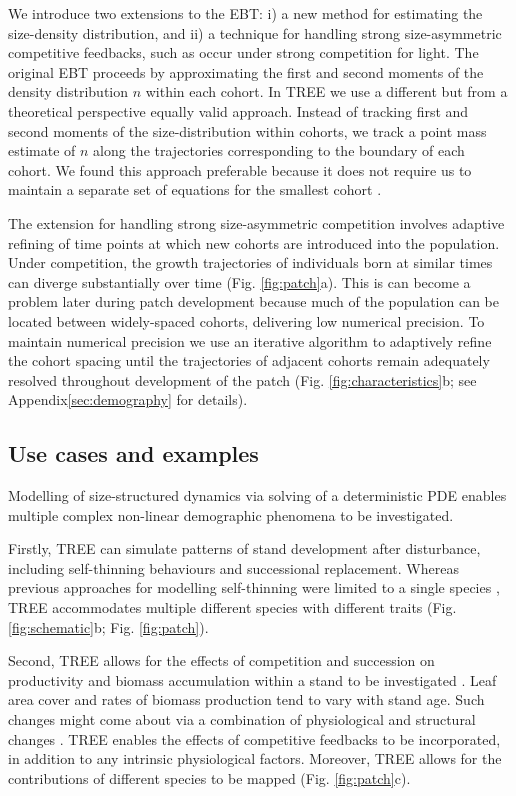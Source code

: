 \documentclass[]{article}
\begin{document}
We introduce two extensions to the EBT: i) a new method for estimating
the size-density distribution, and ii) a technique for handling strong
size-asymmetric competitive feedbacks, such as occur under strong
competition for light. The original EBT
\citep{Deroos-1997, Deroos-1992, Deroos-1988} proceeds by approximating
the first and second moments of the density distribution \(n\) within
each cohort. In TREE we use a different but from a theoretical
perspective equally valid approach. Instead of tracking first and second
moments of the size-distribution within cohorts, we track a point mass
estimate of \(n\) along the trajectories corresponding to the boundary
of each cohort. We found this approach preferable because it does not
require us to maintain a separate set of equations for the smallest
cohort \citep{Deroos-1997}.

The extension for handling strong size-asymmetric competition involves
adaptive refining of time points at which new cohorts are introduced
into the population. Under competition, the growth trajectories of
individuals born at similar times can diverge substantially over time
(Fig. \ref{fig:patch}a). This is can become a problem later during patch
development because much of the population can be located between
widely-spaced cohorts, delivering low numerical precision. To maintain
numerical precision we use an iterative algorithm to adaptively refine
the cohort spacing until the trajectories of adjacent cohorts remain
adequately resolved throughout development of the patch (Fig.
\ref{fig:characteristics}b; see Appendix\ref{sec:demography} for details).

\subsection{Use cases and examples}\label{use-cases-and-examples-1}

Modelling of size-structured dynamics via solving of a deterministic PDE
enables multiple complex non-linear demographic phenomena to be
investigated.

Firstly, TREE can simulate patterns of stand development after
disturbance, including self-thinning behaviours and successional
replacement. Whereas previous approaches for modelling self-thinning
were limited to a single species
\citep[e.g.][]{Barnes-2004, Coomes-2007}, TREE accommodates multiple
different species with different traits (Fig. \ref{fig:schematic}b; Fig.
\ref{fig:patch}).

Second, TREE allows for the effects of competition and succession on
productivity and biomass accumulation within a stand to be investigated
\citep{Falster-2011}. Leaf area cover and rates of biomass production
tend to vary with stand age. Such changes might come about via a
combination of physiological and structural changes
\citep{Binkley-2002, Smith-2001, Ogawa-2010, Coomes-2007}. TREE enables
the effects of competitive feedbacks to be incorporated, in addition to
any intrinsic physiological factors. Moreover, TREE allows for the
contributions of different species to be mapped (Fig. \ref{fig:patch}c).
\end{document}
